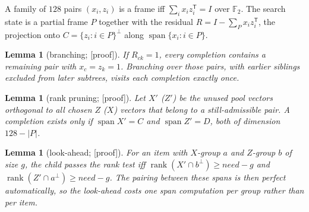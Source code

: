 \documentclass[11pt]{article}
\newtheorem{lemma}[theorem]{Lemma}
\theoremstyle{definition}
\theoremstyle{remark}
\newcommand{\F}{\mathbb{F}}
\newcommand{\evidence}[1]{\textsf{[#1]}}
\begin{document}
A family of $128$ pairs $(x_i,z_i)$ is a frame iff $\sum_i x_iz_i^{\mathsf T}=I$ over $\F_2$. The search state is a partial frame $P$ together with the residual $R=I-\sum_{P}x_iz_i^{\mathsf T}$, the projection onto $C=\{z_i:i\in P\}^{\perp}$ along $\operatorname{span}\{x_i:i\in P\}$.

\begin{lemma}[branching; \evidence{proof}]
If $R_{ck}=1$, every completion contains a remaining pair with $x_c=z_k=1$. Branching over those pairs, with earlier siblings excluded from later subtrees, visits each completion exactly once.
\end{lemma}

\begin{lemma}[rank pruning; \evidence{proof}]
Let $X'$ ($Z'$) be the unused pool vectors orthogonal to all chosen $Z$ ($X$) vectors that belong to a still-admissible pair. A completion exists only if $\operatorname{span}X'=C$ and $\operatorname{span}Z'=D$, both of dimension $128-|P|$.
\end{lemma}

\begin{lemma}[look-ahead; \evidence{proof}]
For an item with $X$-group $a$ and $Z$-group $b$ of size $g$, the child passes the rank test iff $\operatorname{rank}(X'\cap b^{\perp})\ge \mathit{need}-g$ and $\operatorname{rank}(Z'\cap a^{\perp})\ge\mathit{need}-g$. The pairing between these spans is then perfect automatically, so the look-ahead costs one span computation per group rather than per item.
\end{lemma}
\end{document}
